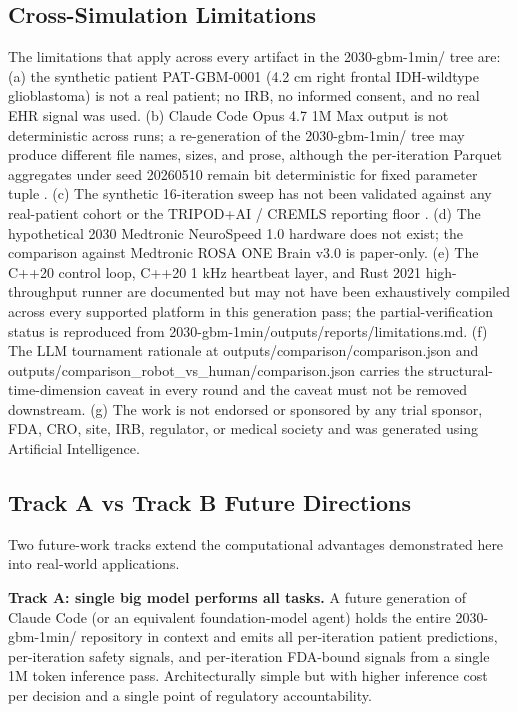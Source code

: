 \subsection{Cross-Simulation Limitations}
\label{sec:limits-cross}

The limitations that apply across every artifact in the
2030-gbm-1min/ tree are: (a) the synthetic patient PAT-GBM-0001
(4.2 cm right frontal IDH-wildtype glioblastoma) is not a real
patient; no IRB, no informed consent, and no real EHR signal was
used. (b) Claude Code Opus 4.7 1M Max output is not deterministic
across runs; a re-generation of the 2030-gbm-1min/ tree may produce
different file names, sizes, and prose, although the per-iteration
Parquet aggregates under seed 20260510 remain bit deterministic for
fixed parameter tuple \cite{claude-opus-47, claude-code}. (c) The
synthetic 16-iteration sweep has not been validated against any
real-patient cohort or the TRIPOD+AI / CREMLS reporting floor
\cite{Collins2024TRIPODAI, ElEmam2024CREMLS}. (d) The hypothetical
2030 Medtronic NeuroSpeed 1.0 hardware does not exist; the
comparison against Medtronic ROSA ONE Brain v3.0
\cite{rosa-one-brain, Lefranc2014ROSAStereotaxy} is paper-only.
(e) The C++20 control loop, C++20 1 kHz heartbeat layer, and Rust
2021 high-throughput runner are documented but may not have been
exhaustively compiled across every supported platform in this
generation pass; the partial-verification status is reproduced from
2030-gbm-1min/outputs/reports/limitations.md. (f) The LLM tournament
rationale at outputs/comparison/comparison.json and
outputs/comparison_robot_vs_human/comparison.json carries the
structural-time-dimension caveat in every round and the caveat must
not be removed downstream. (g) The work is not endorsed or sponsored
by any trial sponsor, FDA, CRO, site, IRB, regulator, or medical
society and was generated using Artificial Intelligence.

\subsection{Track A vs Track B Future Directions}
\label{sec:limits-tracks}

Two future-work tracks extend the computational advantages
demonstrated here into real-world applications.

\textbf{Track A: single big model performs all tasks.} A future
generation of Claude Code (or an equivalent foundation-model agent)
holds the entire 2030-gbm-1min/ repository in context and emits all
per-iteration patient predictions, per-iteration safety signals, and
per-iteration FDA-bound signals from a single 1M token inference
pass. Architecturally simple but with higher inference cost per
decision and a single point of regulatory accountability.

